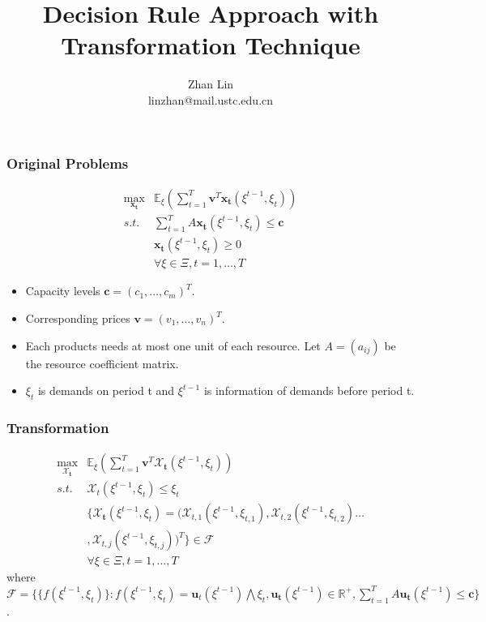 \documentclass{beamer}
\title{Decision Rule Approach with Transformation Technique}
\author{Zhan Lin\\linzhan@mail.ustc.edu.cn}
\begin{document}
\maketitle
\begin{frame}
\frametitle{Original Problems}

\begin{block}{}
\begin{equation}
\begin{array}{ll}
\max\limits_{\mathbf{x_t}} &\mathbb{E}_{\xi}\left(\sum\limits^T_{t=1} \mathbf{v}^T \mathbf{x_t} \left(\xi^{t-1},\xi_t\right)\right)\\
s.t. & \sum\limits^T_{t=1} A \mathbf{x_t} \left(\xi^{t-1},\xi_t\right) \leq \mathbf{c}\\
& \mathbf{x_t}(\xi^{t-1},\xi_t) \geq 0\\
&\forall \xi \in \Xi,t=1,\ldots,T
\end{array}
\label{origin}
\end{equation}
\end{block}
\begin{itemize}
\item
Capacity levels $\mathbf{c}=(c_1,\ldots,c_m)^T$.
\item
Corresponding prices $\mathbf{v} = (v_1,\ldots,v_n)^T$.
\item
Each products needs at most one unit of each resource. Let $A = \left(a_{ij}\right)$ be the resource coefficient matrix.
\item
$\xi_t$ is demands on period t and $\xi^{t-1}$ is information of demands before period t.
 \end{itemize}
\end{frame}
\begin{frame}
\frametitle{Transformation}

\begin{block}{}
\begin{equation}
\begin{array}{ll}
\max\limits_{\mathbf{\mathcal{X}_t}} &\mathbb{E}_{\xi}\left(\sum\limits^T_{t=1} \mathbf{v}^T \mathbf{\mathcal{X}_t}\left(\xi^{t-1},\xi_t\right)\right)\\
s.t. & \mathcal{X}_t(\xi^{t-1},\xi_t) \leq \xi_t\\
& \{\mathbf{\mathcal{X}_t}(\xi^{t-1},\xi_t) = (\mathcal{X}_{t,1}(\xi^{t-1},\xi_{t,1}),\mathcal{X}_{t,2}(\xi^{t-1},\xi_{t,2})\ldots\\
&,\mathcal{X}_{t,j}(\xi^{t-1},\xi_{t,j}))^T\}\in \mathcal{F}  \\
&\forall \xi \in \Xi,t=1,\ldots,T
\end{array}
\label{originsec}
\end{equation}
where $\mathcal{F}=\{\{f(\xi^{t-1},\xi_t)\}:f(\xi^{t-1},\xi_t) = \mathbf{u}_t(\xi^{t-1})\bigwedge \xi_t,\mathbf{u_t}(\xi^{t-1})\in\mathbb{R}^+,\sum\limits^T_{t=1} A \mathbf{u_t}(\xi^{t-1})\leq \mathbf{c}\}$.
\end{block}
\end{frame}
\end{document}
